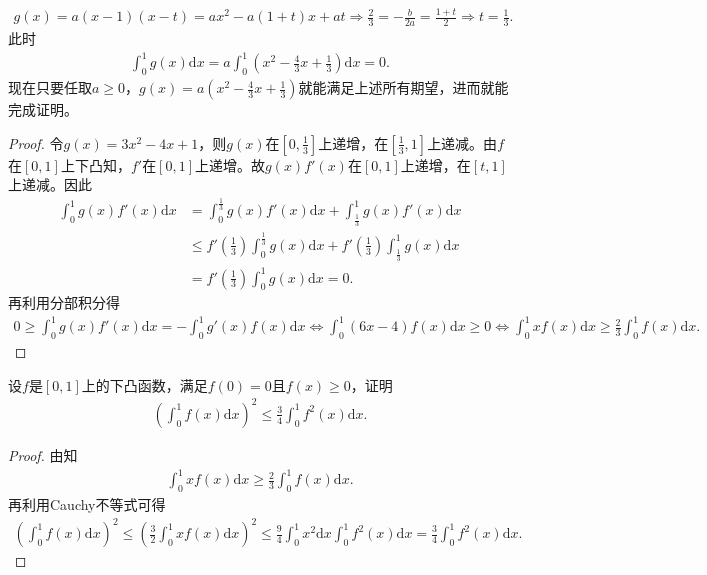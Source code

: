 \documentclass[../../main.tex]{subfiles}%
\begin{document}
\begin{note}
\begin{align*}
g\left( x \right) =a\left( x-1 \right) \left( x-t \right) =ax^2-a\left( 1+t \right) x+at\Longrightarrow \frac{2}{3}=-\frac{b}{2a}=\frac{1+t}{2}\Longrightarrow t=\frac{1}{3}.
\end{align*}
此时
\begin{align*}
\int_0^1{g\left( x \right) \mathrm{d}x}=a\int_0^1{\left( x^2-\frac{4}{3}x+\frac{1}{3} \right) \mathrm{d}x}=0.
\end{align*}
现在只要任取$a\geqslant 0$，$g(x)=a\left( x^2-\frac{4}{3}x+\frac{1}{3} \right)$就能满足上述所有期望，进而就能完成证明。
\end{note}
\begin{proof}
令$g(x)=3x^2-4x+1$，则$g(x)$在$[0,\frac{1}{3}]$上递增，在$[\frac{1}{3},1]$上递减。由$f$在$[0,1]$上下凸知，$f'$在$[0,1]$上递增。故$g(x)f'(x)$在$[0,1]$上递增，在$[t,1]$上递减。因此
\begin{align*}
\int_0^1{g\left( x \right) f'\left( x \right) \mathrm{d}x}&=\int_0^{\frac{1}{3}}{g\left( x \right) f'\left( x \right) \mathrm{d}x}+\int_{\frac{1}{3}}^1{g\left( x \right) f'\left( x \right) \mathrm{d}x} \\
&\leqslant f'\left( \frac{1}{3} \right) \int_0^{\frac{1}{3}}{g\left( x \right) \mathrm{d}x}+f'\left( \frac{1}{3} \right) \int_{\frac{1}{3}}^1{g\left( x \right) \mathrm{d}x} \\
&=f'\left( \frac{1}{3} \right) \int_0^1{g\left( x \right) \mathrm{d}x}=0.
\end{align*}
再利用分部积分得
\begin{align*}
0\geqslant \int_0^1{g\left( x \right) f'\left( x \right) \mathrm{d}x}=-\int_0^1{g'\left( x \right) f\left( x \right) \mathrm{d}x}\Longleftrightarrow \int_0^1{\left( 6x-4 \right) f\left( x \right) \mathrm{d}x}\geqslant 0\Longleftrightarrow \int_0^1{xf\left( x \right) \mathrm{d}x}\geqslant \frac{2}{3}\int_0^1{f\left( x \right) \mathrm{d}x}.
\end{align*}
\end{proof}

\begin{example}
设$f$是$[0,1]$上的下凸函数，满足$f(0)=0$且$f(x)\geqslant 0$，证明
\begin{align*}
\left( \int_0^1{f\left( x \right) \mathrm{d}x} \right) ^2\leqslant \frac{3}{4}\int_0^1{f^2\left( x \right) \mathrm{d}x}.
\end{align*}
\end{example}
\begin{proof}
由知
\begin{align*}
\int_0^1{xf\left( x \right) \mathrm{d}x}\geqslant \frac{2}{3}\int_0^1{f\left( x \right) \mathrm{d}x}.
\end{align*}
再利用Cauchy不等式可得
\begin{align*}
\left( \int_0^1{f\left( x \right) \mathrm{d}x} \right) ^2\leqslant \left( \frac{3}{2}\int_0^1{xf\left( x \right) \mathrm{d}x} \right) ^2\leqslant \frac{9}{4}\int_0^1{x^2\mathrm{d}x}\int_0^1{f^2\left( x \right) \mathrm{d}x}=\frac{3}{4}\int_0^1{f^2\left( x \right) \mathrm{d}x}.
\end{align*}
\end{proof}
\end{document}
